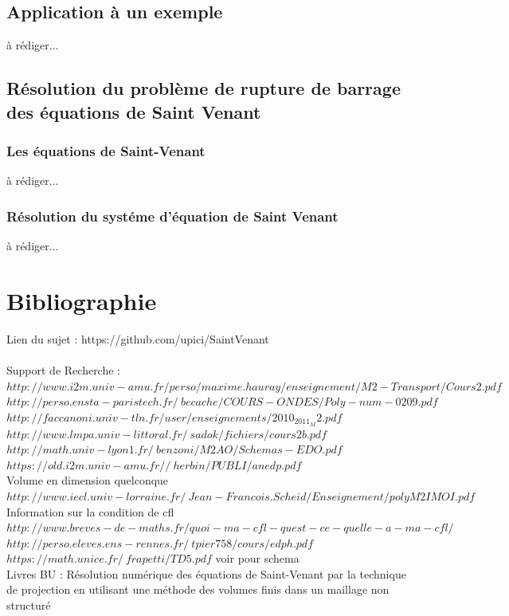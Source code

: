 \documentclass[12pt]{article}
\begin{document}
\subsection{Application à un exemple}
à rédiger...
\subsection{Résolution du problème de rupture de barrage des équations de Saint Venant}
\subsubsection{Les équations de Saint-Venant}
à rédiger...
\subsubsection{Résolution du systéme d'équation de Saint Venant}
à rédiger...

\section{Bibliographie}

\noindent Lien du sujet : https://github.com/upici/SaintVenant
\\
\\Support de Recherche : $http://www.i2m.univ-amu.fr/perso/maxime.hauray/enseignement/M2-Transport/Cours2.pdf$
\\$http://perso.ensta-paristech.fr/~becache/COURS-ONDES/Poly-num-0209.pdf$
\\$http://faccanoni.univ-tln.fr/user/enseignements/2010_2011_M2.pdf$
\\$http://www.lmpa.univ-littoral.fr/~sadok/fichiers/cours2b.pdf$
\\$http://math.univ-lyon1.fr/~benzoni/M2AO/Schemas-EDO.pdf$
\\$https://old.i2m.univ-amu.fr//~herbin/PUBLI/anedp.pdf$
\\Volume en dimension quelconque
\\$http://www.iecl.univ-lorraine.fr/~Jean-Francois.Scheid/Enseignement/polyM2IMOI.pdf$
\\Information sur la condition de cfl
\\$http://www.breves-de-maths.fr/quoi-ma-cfl-quest-ce-quelle-a-ma-cfl/$
\\$http://perso.eleves.ens-rennes.fr/~tpier758/cours/edph.pdf$
\\$https://math.unice.fr/~frapetti/TD5.pdf$ voir pour schema
\\Livres BU : Résolution numérique des équations de Saint-Venant par la technique de projection en utilisant une méthode des volumes finis dans un maillage non structuré 
\end{document}
